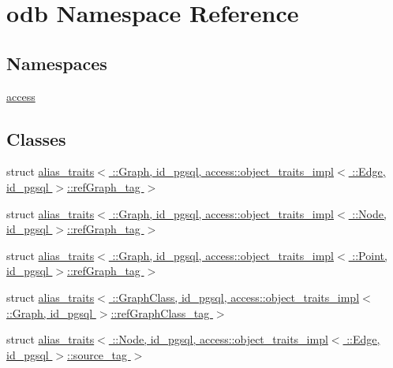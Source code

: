 \hypertarget{namespaceodb}{}\section{odb Namespace Reference}
\label{namespaceodb}
\subsection*{Namespaces}
\begin{DoxyCompactItemize}
\item 
 \hyperlink{namespaceodb_1_1access}{access}
\end{DoxyCompactItemize}
\subsection*{Classes}
\begin{DoxyCompactItemize}
\item 
struct \hyperlink{structodb_1_1alias__traits_3_01_1_1_graph_00_01id__pgsql_00_01access_1_1object__traits__impl_3_0b3284584314bfa017251cf7444a96ae4}{alias\+\_\+traits$<$ \+::\+Graph, id\+\_\+pgsql, access\+::object\+\_\+traits\+\_\+impl$<$ \+::\+Edge, id\+\_\+pgsql $>$\+::ref\+Graph\+\_\+tag $>$}
\item 
struct \hyperlink{structodb_1_1alias__traits_3_01_1_1_graph_00_01id__pgsql_00_01access_1_1object__traits__impl_3_0e5732bb3042e64de1a6d81be59d8f1ee}{alias\+\_\+traits$<$ \+::\+Graph, id\+\_\+pgsql, access\+::object\+\_\+traits\+\_\+impl$<$ \+::\+Node, id\+\_\+pgsql $>$\+::ref\+Graph\+\_\+tag $>$}
\item 
struct \hyperlink{structodb_1_1alias__traits_3_01_1_1_graph_00_01id__pgsql_00_01access_1_1object__traits__impl_3_031ce39b3df44385fcc4600d018caae95}{alias\+\_\+traits$<$ \+::\+Graph, id\+\_\+pgsql, access\+::object\+\_\+traits\+\_\+impl$<$ \+::\+Point, id\+\_\+pgsql $>$\+::ref\+Graph\+\_\+tag $>$}
\item 
struct \hyperlink{structodb_1_1alias__traits_3_01_1_1_graph_class_00_01id__pgsql_00_01access_1_1object__traits__im1cc89598874d63c16da0df475d829efe}{alias\+\_\+traits$<$ \+::\+Graph\+Class, id\+\_\+pgsql, access\+::object\+\_\+traits\+\_\+impl$<$ \+::\+Graph, id\+\_\+pgsql $>$\+::ref\+Graph\+Class\+\_\+tag $>$}
\item 
struct \hyperlink{structodb_1_1alias__traits_3_01_1_1_node_00_01id__pgsql_00_01access_1_1object__traits__impl_3_01db58b174ecb0ad95fbb7b688e9500987}{alias\+\_\+traits$<$ \+::\+Node, id\+\_\+pgsql, access\+::object\+\_\+traits\+\_\+impl$<$ \+::\+Edge, id\+\_\+pgsql $>$\+::source\+\_\+tag $>$}

\end{DoxyCompactItemize}
